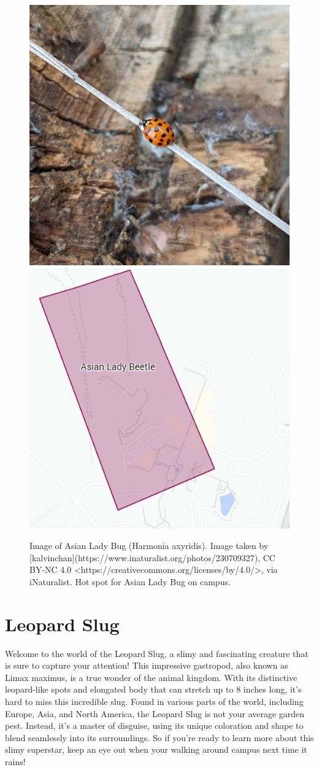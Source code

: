 \documentclass[
]{book}
\begin{document}
\begin{figure}

{\centering \includegraphics[width=0.49\linewidth,height=0.2\textheight]{insect_images/lady_11} \includegraphics[width=0.49\linewidth,height=0.2\textheight]{insect_images/lady_hotspot_11} 

}

\caption{Image of Asian Lady Bug (Harmonia axyridis). Image taken by [kalvinchan](https://www.inaturalist.org/photos/230709327), CC BY-NC 4.0 <https://creativecommons.org/licenses/by/4.0/>, via iNaturalist. Hot spot for Asian Lady Bug on campus.}\label{fig:unnamed-chunk-3}
\end{figure}

\hypertarget{leopard-slug}{%
\section{Leopard Slug}\label{leopard-slug}}

Welcome to the world of the Leopard Slug, a slimy and fascinating creature that is sure to capture your attention! This impressive gastropod, also known as Limax maximus, is a true wonder of the animal kingdom. With its distinctive leopard-like spots and elongated body that can stretch up to 8 inches long, it's hard to miss this incredible slug. Found in various parts of the world, including Europe, Asia, and North America, the Leopard Slug is not your average garden pest. Instead, it's a master of disguise, using its unique coloration and shape to blend seamlessly into its surroundings. So if you're ready to learn more about this slimy superstar, keep an eye out when your walking around campus next time it rains!
\end{document}
